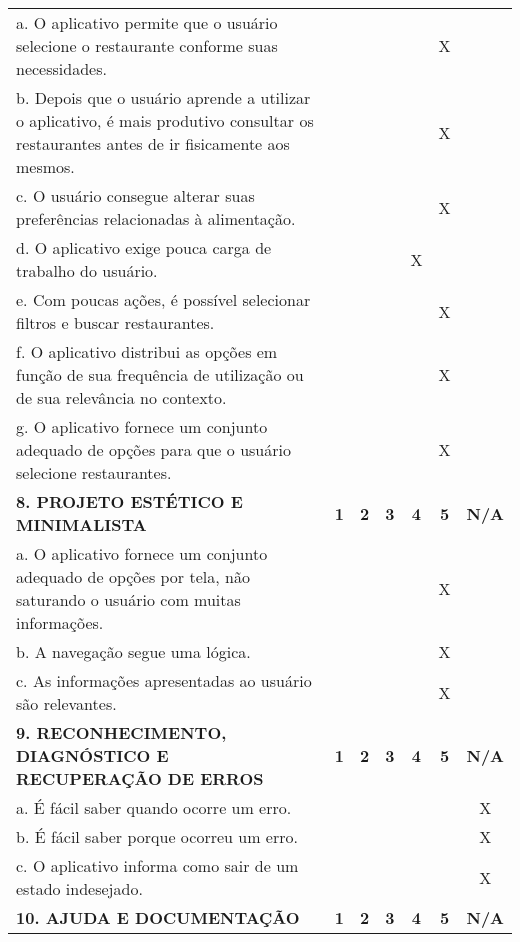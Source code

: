\documentclass[portuguese,oneside]{tcc}
\begin{document}
\begin{center}
\begin{longtabu}{|L{25em}|c|c|c|c|c|c|}
																	a. O aplicativo permite que o usuário selecione o restaurante conforme suas necessidades. & & & & & X & \\ 
																	b. Depois que o usuário aprende a utilizar o aplicativo, é mais produtivo consultar os restaurantes antes de ir fisicamente aos mesmos. & & & & & X & \\ 
																	c. O usuário consegue alterar suas preferências relacionadas à alimentação. & & & & & X & \\ 
																	d. O aplicativo exige pouca carga de trabalho do usuário. & & & & X & & \\ 
																	e. Com poucas ações, é possível selecionar filtros e buscar restaurantes. & & & & & X & \\ 
																	f. O aplicativo distribui as opções em função de sua frequência de utilização ou de sua relevância no contexto.	& & & & & X & \\ 
																	g. O aplicativo fornece um conjunto adequado de opções para que o usuário selecione restaurantes. & & & & & X & \\ 
																	\textbf{8. PROJETO ESTÉTICO E MINIMALISTA} & \textbf{1} & \textbf{2} & \textbf{3} & \textbf{4} & \textbf{5} & \textbf{N/A} \\ 
																	a. O aplicativo fornece um conjunto adequado de opções por tela, não saturando o usuário com muitas informações. & & & & & X & \\ 
																	b. A navegação segue uma lógica. & & & & & X & \\ 
																	c. As informações apresentadas ao usuário são relevantes. & & & & & X & \\ 
																	\textbf{9. RECONHECIMENTO, DIAGNÓSTICO E RECUPERAÇÃO DE ERROS} & \textbf{1} & \textbf{2} & \textbf{3} & \textbf{4} & \textbf{5} & \textbf{N/A} \\ 
																	a. É fácil saber quando ocorre um erro.	& & & & & & X \\ 
																	b. É fácil saber porque ocorreu um erro. & & & & & & X \\ 
																	c. O aplicativo informa como sair de um estado indesejado. & & & & & & X \\ 
																	\textbf{10. AJUDA E DOCUMENTAÇÃO} & \textbf{1} & \textbf{2} & \textbf{3} & \textbf{4} & \textbf{5} & \textbf{N/A} \\ 

\end{longtabu}
\end{center}
\end{document}
